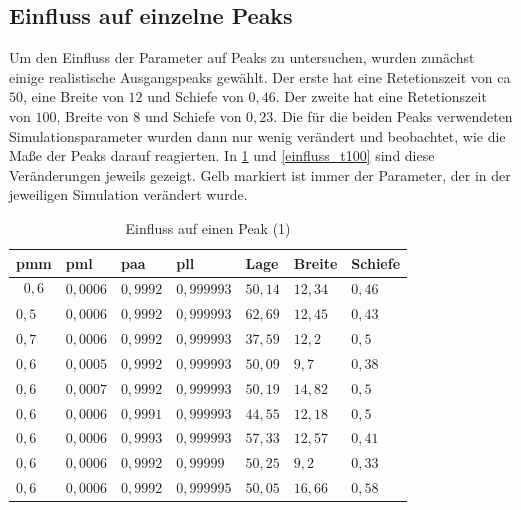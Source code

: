 
\subsection{Einfluss auf einzelne Peaks}
Um den Einfluss der Parameter auf Peaks zu untersuchen, wurden zunächst einige realistische Ausgangspeaks gewählt. Der erste hat eine Retetionszeit von ca $50$, eine Breite von $12$ und Schiefe von $0,46$. Der zweite hat eine Retetionszeit von $100$, Breite von $8$ und Schiefe von $0,23$.
Die für die beiden Peaks verwendeten Simulationsparameter wurden dann nur wenig verändert und beobachtet, wie die Maße der Peaks darauf reagierten. In \ref{einfluss_t50} und \ref{einfluss_t100} sind diese Veränderungen jeweils gezeigt. Gelb markiert ist immer der Parameter, der in der jeweiligen Simulation verändert wurde.

\begin{table}[h]
\centering
\caption{Einfluss auf einen Peak (1)}
\label{einfluss_t50}
\begin{tabular}{|l|l|l|l||l|l|l|}
\hline
pmm & pml    & paa    & pll      & Lage  & Breite & Schiefe \\ \hline \hline
$$0,6$$ & $0,0006$ & $0,9992$ & $0,999993$ & $50,14$ & $12,34$  & $0,46$    \\ \hline \hline
\cellcolor{yellow} $0,5$ & $0,0006$ & $0,9992$ & $0,999993$ & $62,69$ & $12,45$  & $0,43$    \\ \hline
\cellcolor{yellow} $0,7$ & $0,0006$ & $0,9992$ & $0,999993$ & $37,59$ & $12,2$   & $0,5$     \\ \hline
$0,6$ & \cellcolor{yellow} $0,0005$ & $0,9992$ & $0,999993$ & $50,09$ & $9,7$    & $0,38$    \\ \hline
$0,6$ & \cellcolor{yellow} $0,0007$ & $0,9992$ & $0,999993$ & $50,19$ & $14,82$  & $0,5$     \\ \hline
$0,6$ & $0,0006$ & \cellcolor{yellow} $0,9991$ & $0,999993$ & $44,55$ & $12,18$  & $0,5$     \\ \hline
$0,6$ & $0,0006$ & \cellcolor{yellow} $0,9993$ & $0,999993$ & $57,33$ & $12,57$  & $0,41$    \\ \hline
$0,6$ & $0,0006$ & $0,9992$ & \cellcolor{yellow} $0,99999$  & $50,25$ & $9,2$    & $0,33$    \\ \hline
$0,6$ & $0,0006$ & $0,9992$ & \cellcolor{yellow} $0,999995$ & $50,05$ & $16,66$  & $0,58$    \\ \hline
\end{tabular}
\end{table}

